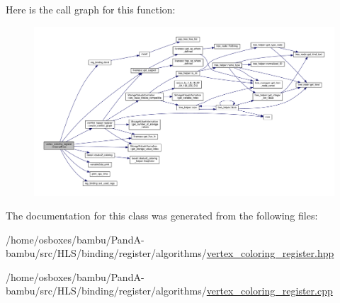 Here is the call graph for this function\+:
\nopagebreak
\begin{figure}[H]
\begin{center}
\leavevmode
\includegraphics[width=350pt]{d4/d36/classvertex__coloring__register_ab7217f4137e671acf2dc41da060318b7_cgraph}
\end{center}
\end{figure}


The documentation for this class was generated from the following files\+:\begin{DoxyCompactItemize}
\item 
/home/osboxes/bambu/\+Pand\+A-\/bambu/src/\+H\+L\+S/binding/register/algorithms/\hyperlink{vertex__coloring__register_8hpp}{vertex\+\_\+coloring\+\_\+register.\+hpp}\item 
/home/osboxes/bambu/\+Pand\+A-\/bambu/src/\+H\+L\+S/binding/register/algorithms/\hyperlink{vertex__coloring__register_8cpp}{vertex\+\_\+coloring\+\_\+register.\+cpp}\end{DoxyCompactItemize}
